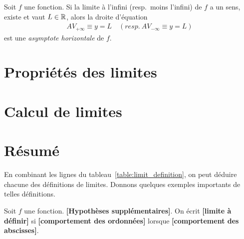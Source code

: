 \documentclass[main.tex]{subfiles}
\begin{document}
\begin{definition}

    Soit $f$ une fonction.
    Si la limite à l'infini (resp.\ moins l'infini) de $f$ a un sens, existe et vaut $L \in \mathbb{R}$,
    alors la droite d'équation
    \begin{align}
        AV_{+\infty} \equiv y = L
        \quad
        \left(resp.\ AV_{-\infty} \equiv y = L\right)
    \end{align}
    est une \emph{asymptote horizontale} de $f$.
\end{definition}

\section{Propriétés des limites}

\section{Calcul de limites}

\section{Résumé}

En combinant les lignes du tableau~\ref{table:limit_definition},
on peut déduire chacune des définitions de limites.
Donnons quelques exemples importants de telles définitions.

\begin{definition}
    [Limite]

    Soit $f$ une fonction.
    \textbf{[Hypothèses supplémentaires]}.
    On écrit \textbf{[limite à définir]}
    si \textbf{[comportement des ordonnées]}
    lorsque \textbf{[comportement des abscisses]}.
\end{definition}
\end{document}
